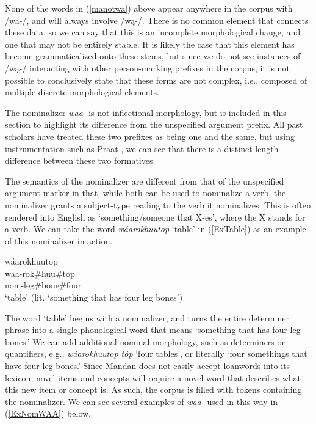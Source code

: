 None of the words in (\ref{manotwa}) above appear anywhere in the corpus with /wa-/, and will always involve /wą-/.  There is no common element that connects these data, so we can say that this is an incomplete morphological change, and one that may not be entirely stable. It is likely the case that this element has become grammaticalized onto these stems, but since we do not see instances of /wą-/ interacting with other person-marking prefixes in the corpus, it is not possible to conclusively state that these forms are not complex, i.e., composed of multiple discrete morphological elements.

\label{nominalizer1}

The nominalizer \textit{waa}- is not inflectional morphology, but is included in this section to highlight its difference from the unspecified argument prefix. All past scholars have treated these two prefixes as being one and the same, but using instrumentation such as Praat \citep{boersmaweenik2016}, we can see that there is a distinct length difference between these two formatives.

The semantics of the nominalizer are different from that of the unspecified argument marker in that, while both can be used to nominalize a verb, the nominalizer grants a subject-type reading to the verb it nominalizes. This is often rendered into English as `something/someone that X-es', where the X stands for a verb. We can take the word \textit{wáarokhuutop} `table' in (\ref{ExTable}) as an example of this nominalizer in action.

\begin{exe}

\item\label{ExTable} \glll wáarokhuutop\\
	waa-rok\#huu\#top\\
	nom-\textnormal{leg}\#\textnormal{bone}\#\textnormal{four}\\
	\glt `table' (lit. `something that has four leg bones')

\end{exe}

The word `table' begins with a nominalizer, and turns the entire determiner phrase into a single phonological word that means `something that has four leg bones.' We can add additional nominal morphology, such as determiners or quantifiers, e.g., \textit{wáarokhuutop tóp} `four tables', or literally `four somethings that have four leg bones.' Since Mandan does not easily accept loanwords into its lexicon, novel items and concepts will require a novel word that describes what this new item or concept is. As such, the corpus is filled with tokens containing the nominalizer. We can see several examples of \textit{waa-} used in this way in (\ref{ExNomWAA}) below.

